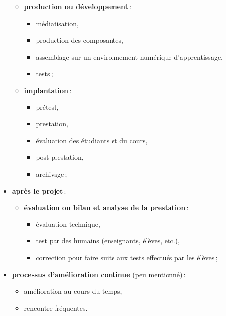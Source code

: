 \begin{frame}[allowframebreaks]
\begin{itemize}
\begin{itemize}
							\item \textbf{production ou développement}\,:
								\begin{itemize}
								\item médiatisation,
								\item production des composantes,
								\item assemblage sur un environnement numérique d'apprentissage,
								\item tests\,;
								\end{itemize}
							\framebreak
							\item \textbf{implantation}\,:
								\begin{itemize}
								\item prétest, 
								\item prestation,
								\item évaluation des étudiants et du cours,
								\item post-prestation,
								\item archivage\,;
								\end{itemize}
							\end{itemize}
						\framebreak
						\item \textbf{après le projet}\,: 
							\begin{itemize}
							\item \textbf{évaluation ou bilan et analyse de la prestation}\,:
								\begin{itemize}
								\item évaluation technique,
								\item test par des humains (enseignants, élèves, etc.),
								\item correction pour faire suite aux tests effectués par les élèves\,;
								\end{itemize}
							\end{itemize}	
						\item \textbf{processus d'amélioration continue} (peu mentionné)\,:
								\begin{itemize}
								\item amélioration au cours du temps, 
								\item rencontre fréquentes.
								\end{itemize}
						\end{itemize}		
							
						
					\end{frame}
							
						
